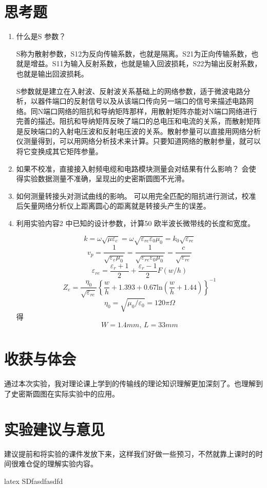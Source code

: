 \documentclass{../source/Experiment}
\begin{document}
    \section{思考题}
        \begin{enumerate}
            \item 什么是S 参数？
            
            S称为散射参数，S12为反向传输系数，也就是隔离。S21为正向传输系数，也就是增益。S11为输入反射系数，也就是输入回波损耗，S22为输出反射系数，也就是输出回波损耗。

            S参数就是建立在入射波、反射波关系基础上的网络参数，适于微波电路分析，以器件端口的反射信号以及从该端口传向另一端口的信号来描述电路网络。同N端口网络的阻抗和导纳矩阵那样，用散射矩阵亦能对N端口网络进行完善的描述。阻抗和导纳矩阵反映了端口的总电压和电流的关系，而散射矩阵是反映端口的入射电压波和反射电压波的关系。散射参量可以直接用网络分析仪测量得到，可以用网络分析技术来计算。只要知道网络的散射参量，就可以将它变换成其它矩阵参量。
            \item 如果不校准，直接接入射频电缆和电路模块测量会对结果有什么影响？
            会使得实验数据测量不准确，呈现出的史密斯圆图不光滑。
            \item 如何测量转接头对测试曲线的影响。
            可以用完全匹配的阻抗进行测试，校准后矢量网络分析仪上距离圆心的距离就是转接头产生的误差。
            \item 利用实验内容2 中已知的设计参数，计算50 欧半波长微带线的长度和宽度。
            
            $$k = \omega \sqrt{\mu \varepsilon _e} = \omega \sqrt{\varepsilon _{re}\varepsilon _0\mu _0} = k_0\sqrt{\varepsilon _{re}}$$
                         $$v_p = \frac{1}{\sqrt{\varepsilon _e\mu _0}} = \frac{1}{\sqrt{\varepsilon _{re}\varepsilon _0\mu _0}} = \frac{c}{\sqrt{\varepsilon _{re}}}$$
                        $$\varepsilon _{re} = \frac{\varepsilon _r + 1}{2} + \frac{\varepsilon _r-1}{2}F(w/h)$$
                        $$Z_e = \frac{\eta _0}{\sqrt{\varepsilon _{re}}}\left\{{\frac{w}{h}+1.393+0.67\mathrm{ln}(\frac{w}{h}+1.44)}\right\}^{-1}$$
                        $$\eta _0 = \sqrt{\mu _0/\varepsilon _0} = 120\pi \Omega $$
得
            $$W = 1.4mm ,\, L = 33mm$$
        \end{enumerate}

    \section{收获与体会}
    通过本次实验，我对理论课上学到的传输线的理论知识理解更加深刻了。也理解到了史密斯圆图在实际实验中的应用。
    \section{实验建议与意见}
    建议提前和将实验的课件发放下来，这样我们好做一些预习，不然就靠上课时的时间很难仓促的理解实验内容。  

      \textsf{latex}  SDfasdfasdfd
\end{document}
